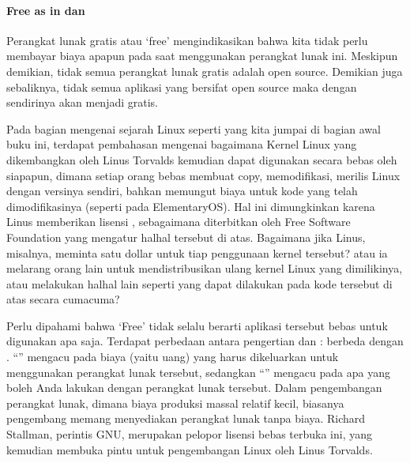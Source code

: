 \documentclass[letterpaper,10pt,english]{sphinxmanual}
\begin{document}
\paragraph{Free as in  dan }
\label{\detokenize{sesi1/fossgis:free-as-in-free-speech-dan-free-drinks}}
Perangkat lunak gratis atau ‘free’ mengindikasikan bahwa kita tidak perlu membayar biaya apapun pada saat menggunakan perangkat lunak ini. Meskipun demikian, tidak semua perangkat lunak gratis adalah open source. Demikian juga sebaliknya, tidak semua aplikasi yang bersifat open source maka dengan sendirinya akan menjadi gratis.

Pada bagian mengenai sejarah Linux seperti yang kita jumpai di bagian awal buku ini, terdapat pembahasan mengenai bagaimana Kernel Linux yang dikembangkan oleh Linus Torvalds kemudian dapat digunakan secara bebas oleh siapapun, dimana setiap orang bebas membuat copy, memodifikasi, merilis Linux dengan versinya sendiri, bahkan memungut biaya untuk kode yang telah dimodifikasinya (seperti pada ElementaryOS). Hal ini dimungkinkan karena Linus memberikan lisensi , sebagaimana diterbitkan oleh Free Software Foundation yang mengatur hal\sphinxhyphen{}hal tersebut di atas. Bagaimana jika Linus, misalnya, meminta satu dollar untuk tiap penggunaan kernel tersebut? atau ia melarang orang lain untuk mendistribusikan ulang kernel Linux yang dimilikinya, atau melakukan hal\sphinxhyphen{}hal lain seperti yang dapat dilakukan pada kode tersebut di atas secara cuma\sphinxhyphen{}cuma?

Perlu dipahami bahwa ‘Free’ tidak selalu berarti aplikasi tersebut bebas untuk digunakan apa saja. Terdapat perbedaan antara pengertian  dan :  berbeda dengan . “” mengacu pada biaya (yaitu uang) yang harus dikeluarkan untuk menggunakan perangkat lunak tersebut, sedangkan “” mengacu pada apa yang boleh Anda lakukan dengan perangkat lunak tersebut. Dalam pengembangan perangkat lunak, dimana biaya produksi massal relatif kecil, biasanya pengembang memang menyediakan perangkat lunak tanpa biaya. Richard Stallman, perintis GNU, merupakan pelopor lisensi bebas terbuka ini, yang kemudian membuka pintu untuk pengembangan Linux oleh Linus Torvalds.
\end{document}
